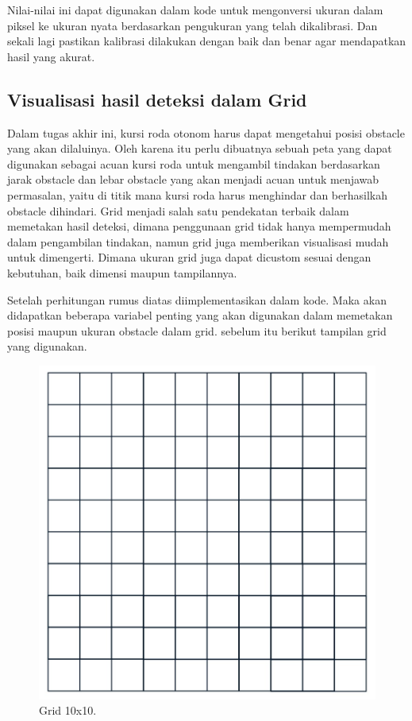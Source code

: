 Nilai-nilai ini dapat digunakan dalam kode untuk mengonversi ukuran dalam piksel ke ukuran nyata berdasarkan pengukuran yang telah dikalibrasi. Dan sekali lagi pastikan kalibrasi dilakukan dengan baik dan benar agar mendapatkan hasil yang akurat. 

\subsection{Visualisasi hasil deteksi dalam Grid}
Dalam tugas akhir ini, kursi roda otonom harus dapat mengetahui posisi obstacle yang akan dilaluinya. Oleh karena itu perlu dibuatnya sebuah peta yang dapat digunakan sebagai acuan kursi roda untuk mengambil tindakan berdasarkan jarak obstacle dan lebar obstacle yang akan menjadi acuan untuk menjawab permasalan, yaitu di titik mana kursi roda harus menghindar dan berhasilkah obstacle dihindari. Grid menjadi salah satu pendekatan terbaik dalam memetakan hasil deteksi, dimana penggunaan grid tidak hanya mempermudah dalam pengambilan tindakan, namun grid juga memberikan visualisasi mudah untuk dimengerti. Dimana ukuran grid juga dapat dicustom sesuai dengan kebutuhan, baik dimensi maupun tampilannya. 

Setelah perhitungan rumus diatas diimplementasikan dalam kode. Maka akan didapatkan beberapa variabel penting yang akan digunakan dalam memetakan posisi maupun ukuran obstacle dalam grid. sebelum itu berikut tampilan grid yang digunakan. 

\begin{figure}[H]
  \centering
  \includegraphics[scale=0.3]{gambar/gridtanpakamera2.jpg}
  \caption{Grid 10x10.}
  \label{fig:Grid10x10}
\end{figure}

